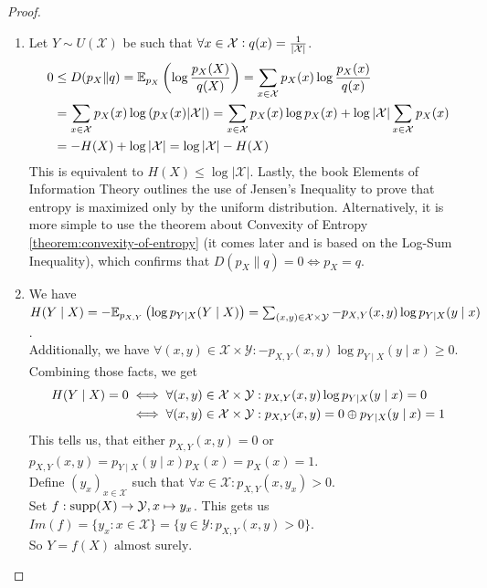 \begin{proof}
\begin{enumerate}
        \item
            Let $Y \sim U(\mathcal{X})$ be such that $\forall x \in \mathcal{X}\vcentcolon q(x)=\frac{1}{|\mathcal{X}|}$.
            \begin{align*}
                0 &\le D(p_X \| q)
                = \mathbb{E}_{p_X}\left(\log \frac{p_X(X)}{q(X)}\right)
                = \sum_{x \in \mathcal{X}}{p_X(x) \log \frac{p_X(x)}{q(x)}} \\
                &= \sum_{x \in \mathcal{X}}{p_X(x) \log\left(p_X(x)|\mathcal{X}|\right)}
                = \sum_{x \in \mathcal{X}}{p_X(x) \log p_X(x)} + \log |\mathcal{X}| \sum_{x \in \mathcal{X}}{p_X(x)}\\
                &= -H(X) + \log |\mathcal{X}| = \log |\mathcal{X}| - H(X)
            \end{align*}
            This is equivalent to $H(X) \le \log |\mathcal{X}|$.
		    Lastly, the book Elements of Information Theory \cite{Thomas:ElementsOfInformationTheory} outlines the use of Jensen's Inequality to prove that entropy is maximized only by the uniform distribution. 
            Alternatively, it is more simple to use the theorem about Convexity of Entropy \ref{theorem:convexity-of-entropy} (it comes later and is based on the Log-Sum Inequality), 
            which confirms that $D(p_X \| q) = 0 \iff p_X = q$.
        \item
            We have $H(Y \mid X) = -\mathbb{E}_{p_{X,Y}}\left(\log p_{Y \mid X}(Y \mid X)\right) = \sum_{(x, y) \in \mathcal{X} \times \mathcal{Y}}{-p_{X,Y}(x, y) \log p_{Y \mid X}(y \mid x)}$. \\
            Additionally, we have $\forall (x, y) \in \mathcal{X} \times \mathcal{Y}: -p_{X,Y}(x, y) \log p_{Y \mid X}(y \mid x) \ge 0$. \\
            Combining those facts, we get
            \begin{align*}
                H(Y \mid X) = 0
                &\iff \forall (x, y) \in \mathcal{X} \times \mathcal{Y}: p_{X,Y}(x, y) \log p_{Y \mid X}(y \mid x) = 0 \\
                &\iff \forall (x, y) \in \mathcal{X} \times \mathcal{Y}: p_{X,Y}(x, y) = 0 \oplus p_{Y \mid X}(y \mid x) = 1
            \end{align*}
            This tells us, that either $p_{X,Y}(x, y) = 0$ or $p_{X,Y}(x, y) = p_{Y \mid X}(y \mid x)p_X(x) = p_X(x) = 1$. \\
            Define $(y_x)_{x \in \mathcal{X}}$ such that $\forall x \in \mathcal{X}: p_{X,Y}(x, y_x) > 0$. \\
            Set $f: \operatorname{supp}(X) \rightarrow \mathcal{Y}, x \mapsto y_x$. This gets us $Im(f) = \{y_x: x \in \mathcal{X}\} = \{y \in \mathcal{Y}: p_{X,Y}(x, y) > 0\}$. \\
            So $Y = f(X) \; \text{almost surely}$.


\end{enumerate}
\end{proof}
